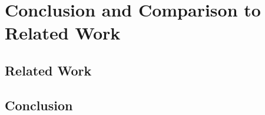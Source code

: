 
\chapter{Conclusion and Comparison to Related Work}

\label{ch:eighth} %

\section{Related Work}

\section{Conclusion}


